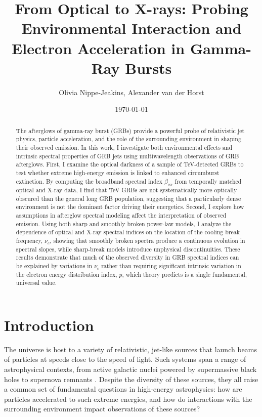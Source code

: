 \documentclass{article}
\title{\textbf{From Optical to X-rays: Probing Environmental Interaction and Electron Acceleration in Gamma-Ray Bursts}}
\author[]{Olivia Nippe-Jeakins, Alexander van der Horst}
\affil[]{\textit{Department of Physics, The George Washington University, Washington, D.C., USA}}
\date{\today}
\begin{document}
\maketitle



\begin{abstract}
The afterglows of gamma-ray burst (GRBs) provide a powerful probe of relativistic jet physics, particle acceleration, and the role of the surrounding environment in shaping their observed emission. In this work, I investigate both environmental effects and intrinsic spectral properties of GRB jets using multiwavelength observations of GRB afterglows. First, I examine the optical darkness of a sample of TeV-detected GRBs to test whether extreme high-energy emission is linked to enhanced circumburst extinction. By computing the broadband spectral index $\beta_{ox}$ from temporally matched optical and X-ray data, I find that TeV GRBs are not systematically more optically obscured than the general long GRB population, suggesting that a particularly dense environment is not the dominant factor driving their energetics. Second, I explore how assumptions in afterglow spectral modeling affect the interpretation of observed emission. Using both sharp and smoothly broken power-law models, I analyze the dependence of optical and X-ray spectral indices on the location of the cooling break frequency, $\nu_c$, showing that smoothly broken spectra produce a continuous evolution in spectral slopes, while sharp-break models introduce unphysical discontinuities. These results demonstrate that much of the observed diversity in GRB spectral indices can be explained by variations in $\nu_c$ rather than requiring significant intrinsic variation in the electron energy distribution index, $p$, which theory predicts is a single fundamental, universal value. 
\end{abstract}



\section{Introduction}


The universe is host to a variety of relativistic, jet-like sources that launch beams of particles at speeds close to the speed of light. Such systems span a range of astrophysical contexts, from active galactic nuclei powered by supermassive black holes to supernova remnants \parencite{white_pap}. Despite the diversity of these sources, they all raise a common set of fundamental questions in high-energy astrophysics: how are particles accelerated to such extreme energies, and how do interactions with the surrounding environment impact observations of these sources?
\end{document}
